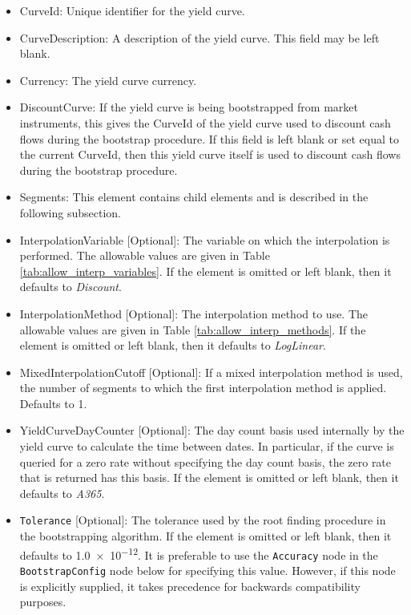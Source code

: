 \begin{itemize}
\item CurveId: Unique identifier for the yield curve.
\item CurveDescription: A description of the yield curve. This field may be left blank.
\item Currency: The yield curve currency.
\item DiscountCurve: If the yield curve is being bootstrapped from market instruments, this gives the CurveId of the
yield curve used to discount cash flows during the bootstrap procedure. If this field is left blank or set equal to the
current CurveId, then this yield curve itself is used to discount cash flows during the bootstrap procedure.
\item Segments: This element contains child elements and is described in the following subsection.
\item InterpolationVariable [Optional]: The variable on which the interpolation is performed. The allowable values are
given in Table \ref{tab:allow_interp_variables}. If the element is omitted or left blank, then it defaults to
\emph{Discount}.
\item InterpolationMethod [Optional]: The interpolation method to use. The allowable values are given in Table
\ref{tab:allow_interp_methods}. If the element is omitted or left blank, then it defaults to \emph{LogLinear}.
\item MixedInterpolationCutoff [Optional]: If a mixed interpolation method is used, the number of segments to which the
  first interpolation method is applied. Defaults to 1.
\item YieldCurveDayCounter [Optional]: The day count basis used internally by the yield curve to calculate the time between
dates. In particular, if the curve is queried for a zero rate without specifying the day count basis, the zero rate that
is returned has this basis. If the element is omitted or left blank, then it defaults to \emph{A365}.

\item \lstinline!Tolerance! [Optional]: The tolerance used by the root finding procedure in the bootstrapping algorithm. If the
element is omitted or left blank, then it defaults to \num[scientific-notation=true]{1.0e-12}. It is preferable to use the
\lstinline!Accuracy! node in the \lstinline!BootstrapConfig! node below for specifying this value. However, if this node is
explicitly supplied, it takes precedence for backwards compatibility purposes.


\end{itemize}
